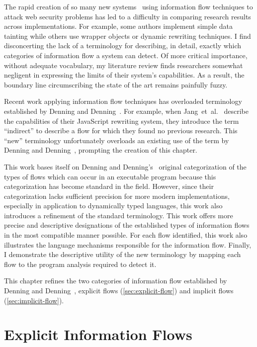 The rapid creation of so many new systems~\cite{chugh.etal+09, yaowen.etal+04, jang.etal+10, robertson.vigna+09, vogt.etal+07} using information flow techniques to attack web security problems has led to a difficulty in comparing research results across implementations.
For example, some authors implement simple data tainting while others use wrapper objects or dynamic rewriting techniques.
I find disconcerting the lack of a terminology for describing, in detail, exactly which categories of information flow a system can detect.
Of more critical importance, without adequate vocabulary, my literature review finds researchers somewhat negligent in expressing the limits of their system's capabilities.
As a result, the boundary line circumscribing the state of the art remains painfully fuzzy.

Recent work applying information flow techniques has overloaded terminology established by Denning and Denning~\cite{denning.denning+77}.
For example, when Jang~et~al.~\cite{jang.etal+10} describe the capabilities of their JavaScript rewriting system, they introduce the term ``indirect'' to describe a flow for which they found no previous research.
This ``new'' terminology unfortunately overloads an existing use of the term by Denning and Denning~\cite{denning.denning+77}, prompting the creation of this chapter.

This work bases itself on Denning and Denning's~\cite{denning.denning+77} original categorization of the types of flows which can occur in an executable program because this categorization has become standard in the field.
However, since their categorization lacks sufficient precision for more modern implementations, especially in application to dynamically typed languages, this work also introduces a refinement of the standard terminology.
This work offers more precise and descriptive designations of the established types of information flows in the most compatible manner possible.
For each flow identified, this work also illustrates the language mechanisms responsible for the information flow.
Finally, I demonstrate the descriptive utility of the new terminology by mapping each flow to the program analysis required to detect it.

This chapter refines the two categories of information flow established by Denning and Denning~\cite{denning.denning+77}, explicit flows (\autoref{sec:explicit-flow}) and implicit flows (\autoref{sec:implicit-flow}).

\section{Explicit Information Flows}
\label{sec:explicit-flow}

